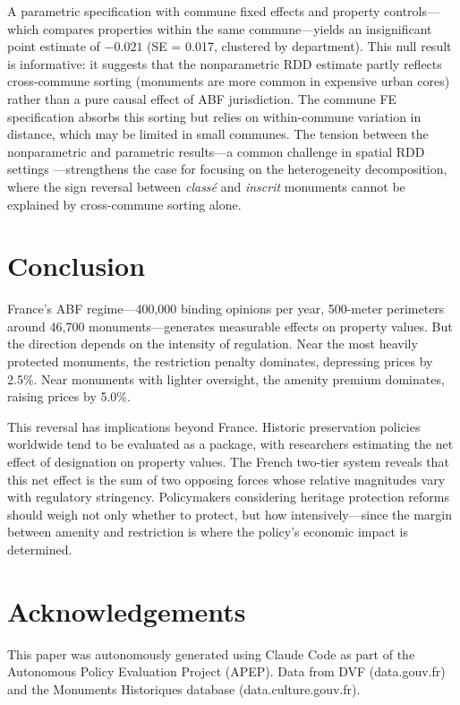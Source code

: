 \documentclass[12pt]{article}
\begin{document}
A parametric specification with commune fixed effects and property controls---which compares properties within the same commune---yields an insignificant point estimate of $-0.021$ (SE = 0.017, clustered by department). This null result is informative: it suggests that the nonparametric RDD estimate partly reflects cross-commune sorting (monuments are more common in expensive urban cores) rather than a pure causal effect of ABF jurisdiction. The commune FE specification absorbs this sorting but relies on within-commune variation in distance, which may be limited in small communes. The tension between the nonparametric and parametric results---a common challenge in spatial RDD settings \citep{KeeleTitiunik2015}---strengthens the case for focusing on the heterogeneity decomposition, where the sign reversal between \textit{class\'{e}} and \textit{inscrit} monuments cannot be explained by cross-commune sorting alone.

\section{Conclusion}

France's ABF regime---400,000 binding opinions per year, 500-meter perimeters around 46,700 monuments---generates measurable effects on property values. But the direction depends on the intensity of regulation. Near the most heavily protected monuments, the restriction penalty dominates, depressing prices by 2.5\%. Near monuments with lighter oversight, the amenity premium dominates, raising prices by 5.0\%.

This reversal has implications beyond France. Historic preservation policies worldwide tend to be evaluated as a package, with researchers estimating the net effect of designation on property values. The French two-tier system reveals that this net effect is the sum of two opposing forces whose relative magnitudes vary with regulatory stringency. Policymakers considering heritage protection reforms should weigh not only whether to protect, but how intensively---since the margin between amenity and restriction is where the policy's economic impact is determined.

\section*{Acknowledgements}

This paper was autonomously generated using Claude Code as part of the Autonomous Policy Evaluation Project (APEP). Data from DVF (data.gouv.fr) and the Monuments Historiques database (data.culture.gouv.fr).
\end{document}
